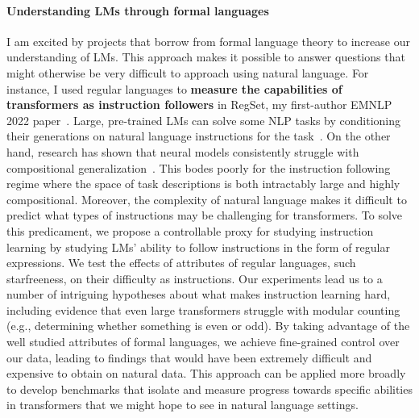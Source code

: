 \documentclass[11pt]{article}
\begin{document}
\paragraph{Understanding LMs through formal languages}

I am excited by projects 
that borrow from formal language theory
to increase our understanding of LMs.
This approach makes it possible to answer 
questions that might otherwise be very difficult to approach using natural language.
For instance, I used regular languages to 
\textbf{measure the capabilities of transformers as instruction followers}
in RegSet, my first-author EMNLP 2022 paper~\cite{Finlayson2022WhatMI}. 
Large, pre-trained LMs can solve some NLP tasks 
by conditioning their generations on natural language instructions 
for the task~\cite{mishra2021crosstask, Wei2021FinetunedLM}. 
On the other hand, 
research has shown that neural models consistently struggle with
compositional generalization~\cite{Lake2018GeneralizationWS}. 
This bodes poorly for the instruction following regime
where the space of task descriptions is both intractably large 
and highly compositional.
Moreover, the complexity of natural language makes it difficult to
predict what types of instructions may be challenging for transformers.
To solve this predicament, 
we propose a controllable proxy for studying instruction learning
by studying LMs' ability to follow instructions in the form of regular expressions.
We test the effects of attributes of regular languages,
such starfreeness, on their difficulty as instructions.
Our experiments lead us to a number of intriguing hypotheses 
about what makes instruction learning hard, 
including evidence that even large transformers struggle with modular counting 
(e.g., determining whether something is even or odd). 
By taking advantage of the well studied attributes of formal languages,
we achieve fine-grained control over our data, leading to findings that
would have been extremely difficult and expensive to obtain on natural data.
This approach can be applied more broadly to develop benchmarks 
that isolate and measure progress towards specific abilities 
in transformers that we might hope to see in natural language settings.
\end{document}

